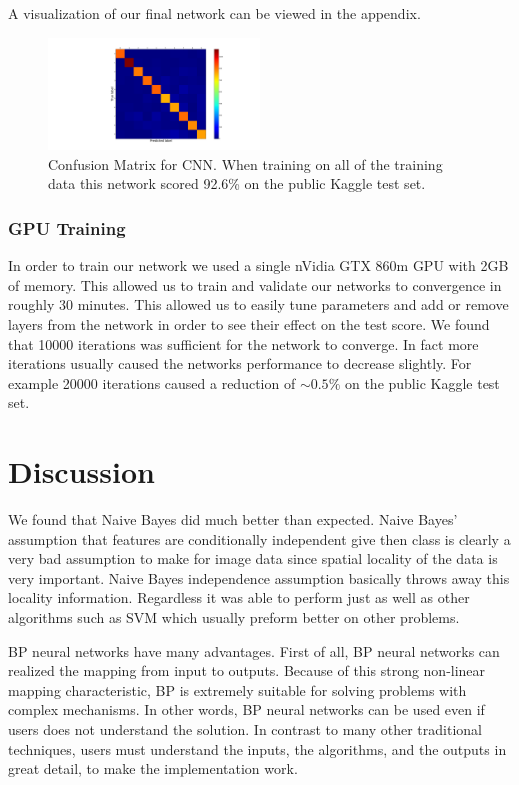 \documentclass[10pt,twocolumn]{article}
\begin{document}
A visualization of our final network can be viewed in the appendix.
\begin{figure}
\includegraphics[trim=500 50 200 50,clip=true,width=0.5\textwidth]{./confusion.png}
\caption{Confusion Matrix for CNN. When training on all of the training data this network scored 92.6\% on the public Kaggle test set.}
\end{figure}
\subsubsection{GPU Training}
In order to train our network we used a single nVidia GTX 860m GPU with 2GB of memory. This allowed us to train and validate our networks to convergence in roughly 30 minutes. This allowed us to easily tune parameters and add or remove layers from the network in order to see their effect on the test score. We found that 10000 iterations was sufficient for the network to converge. In fact more iterations usually caused the networks performance to decrease slightly. For example 20000 iterations caused a reduction of $\sim 0.5\%$ on the public Kaggle test set. 

\section{Discussion}
We found that Naive Bayes did much better than expected. Naive Bayes' assumption that features are conditionally independent give then class is clearly a very bad assumption to make for image data since spatial locality of the data is very important. Naive Bayes independence assumption basically throws away this locality information. Regardless it was able to perform just as well as other algorithms such as SVM which usually preform better on other problems. 

BP neural networks have many advantages. First of all, BP neural networks can realized the mapping from input to outputs. Because of this strong non-linear mapping characteristic, BP is extremely suitable for solving problems with complex mechanisms. In other words, BP neural networks can be used even if users does not understand the solution. In contrast to many other traditional techniques, users must understand the inputs, the algorithms, and the outputs in great detail, to make the implementation work.
\end{document}
